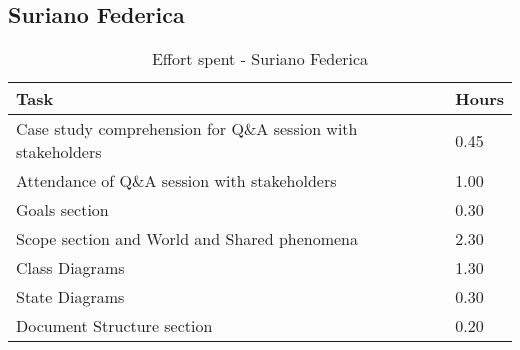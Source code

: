 \subsection{Suriano Federica}
\renewcommand{\arraystretch}{2}
\begin{longtable}{|m{9cm}|m{1.2cm}|}
\caption{Effort spent - Suriano Federica}\\
\hline
\endfirsthead
\endhead
\hline
\endlastfoot
\rowcolor{white!40!blue!70}
\textbf{Task} &\hfil {\textbf{Hours}}\\
\hline
Case study comprehension for Q\&A session with stakeholders & \hfil 0.45\\
Attendance of Q\&A session with stakeholders & \hfil 1.00\\
Goals section & \hfil 0.30\\
Scope section and World and Shared phenomena & \hfil 2.30\\
Class Diagrams & \hfil 1.30\\
State Diagrams & \hfil 0.30\\
Document Structure section & \hfil 0.20\\
\hline
\end{longtable}
